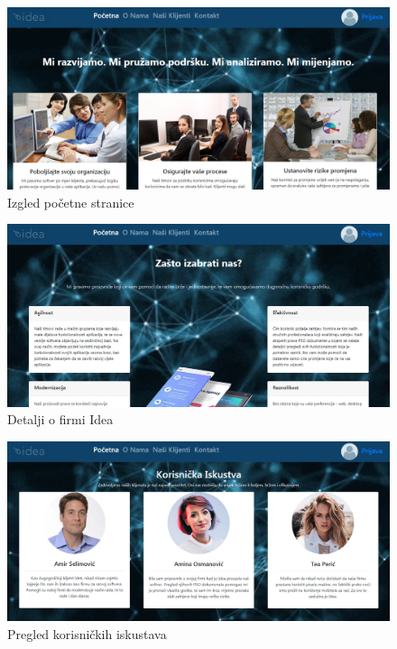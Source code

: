 \documentclass[12pt,a4paper]{article}
\begin{document}
\begin{figure}[H]
\center
\includegraphics[scale=0.35]{../res/UI/home.PNG}
\caption{Izgled početne stranice}
\label{s1}
\end{figure}

\begin{figure}[H]
\center
\includegraphics[scale=0.35]{../res/UI/about.PNG}
\caption{Detalji o firmi Idea}
\label{s2}
\end{figure}

\begin{figure}[H]
\center
\includegraphics[scale=0.35]{../res/UI/clients.PNG}
\caption{Pregled korisničkih iskustava}
\label{s3}
\end{figure}
\end{document}
